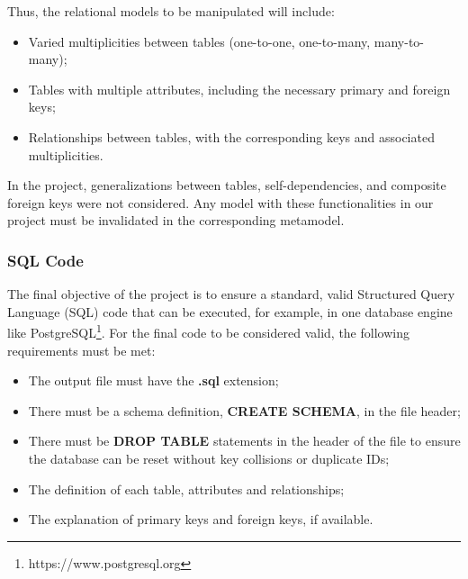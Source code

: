 \documentclass[10pt]{article}
\begin{document}
Thus, the relational models to be manipulated will include:

\begin{itemize}

    \item Varied multiplicities between tables (one-to-one, one-to-many, many-to-many);
    
    \item Tables with multiple attributes, including the necessary primary and foreign keys;
    
    \item Relationships between tables, with the corresponding keys and associated multiplicities.
    
\end{itemize}

In the project, generalizations between tables, self-dependencies, and composite foreign keys were not considered. Any model with these functionalities in our project must be invalidated in the corresponding metamodel.

\subsubsection{SQL Code}

The final objective of the project is to ensure a standard, valid Structured Query Language (SQL) code that can be executed, for example, in one database engine like PostgreSQL\footnote{https://www.postgresql.org}. For the final code to be considered valid, the following requirements must be met:

\begin{itemize}

    \item The output file must have the \textbf{.sql} extension;
    
    \item There must be a schema definition, \textbf{CREATE SCHEMA}, in the file header;
    
    \item There must be \textbf{DROP TABLE} statements in the header of the file to ensure the database can be reset without key collisions or duplicate IDs;
    
    \item The definition of each table, attributes and relationships;
    
    \item The explanation of primary keys and foreign keys, if available.
    
\end{itemize}
\end{document}
